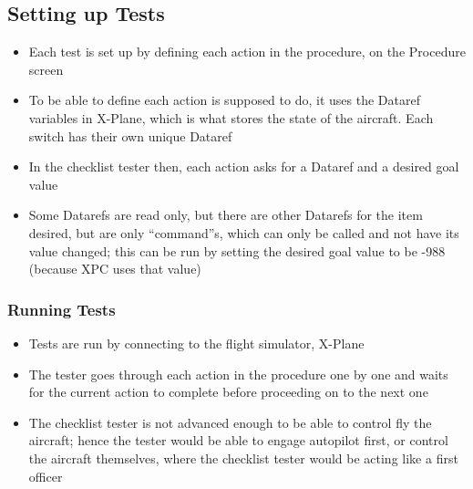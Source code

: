 \documentclass[../dissertation.tex]{subfiles}
\begin{document}
\subsection{Setting up Tests}
\begin{itemize}
  \item Each test is set up by defining each action in the procedure,
    on the Procedure screen
  \item To be able to define each action is supposed to do, it uses
    the Dataref variables in X-Plane, which is what stores the state
    of the aircraft. Each switch has their own unique Dataref
  \item In the checklist tester then, each action asks for a
    Dataref and a desired goal value
  \item Some Datarefs are read only, but there are other Datarefs
    for the item desired, but are only \enquote{command}s, which
    can only be called and not have its value changed; this can be
    run by setting the desired goal value to be -988 (because XPC uses that value)
\end{itemize}

\subsubsection{Running Tests}
\begin{itemize}
  \item Tests are run by connecting to the flight simulator, X-Plane
  \item The tester goes through each action in the procedure one by one
    and waits for the current action to complete before proceeding on to
    the next one
  \item The checklist tester is not advanced enough to be able to control
    fly the aircraft; hence the tester would be able to engage autopilot
    first, or control the aircraft themselves, where the checklist tester
    would be acting like a first officer
\end{itemize}
\end{document}
